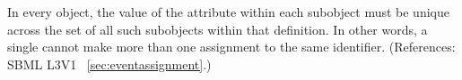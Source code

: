 In every \Event object, the value of the  attribute within
each \EventAssignment subobject must be unique across the set of all such
\EventAssignment subobjects within that \Event definition.  In other words,
a single \Event cannot make more than one assignment to the same identifier.
(References: SBML L3V1 ~\ref{sec:eventassignment}.)
